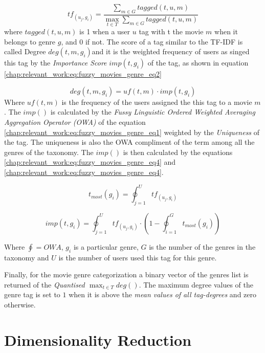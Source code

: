 \begin{equation}\label{chap:relevant_work:eq:fuzzy_movies_genre_eq1}
	tf_(u_{j},g_{i}) = \frac{\sum_{m \in G} tagged(t,u,m) }{ \max_{t \in T} \sum_{m \in G} tagged(t,u,m)}
\end{equation}
where $tagged(t,u,m)$ is 1 when a user $u$ tag with t the movie $m$ when it belongs to genre $g$, and $0$ if not. The score of a tag similar to the TF-IDF is called Degree $deg(t,m,g_{i})$and it is the weighted frequency of users as singed this tag by the \textit{Importance Score} $imp(t,g_{i})$ of the tag, as shown in equation \ref{chap:relevant_work:eq:fuzzy_movies_genre_eq2}

\begin{equation}\label{chap:relevant_work:eq:fuzzy_movies_genre_eq2}
	deg(t,m,g_{i}) = uf(t,m) \cdot imp(t,g_{i})
\end{equation}
Where $uf(t,m)$ is the frequency of the users assigned the this tag to a movie $m$. The $imp()$ is calculated by the \textit{Fussy Linguistic Ordered Weighted Averaging Aggregation Operator (OWA)} of the equation \ref{chap:relevant_work:eq:fuzzy_movies_genre_eq1} weighted by the \textit{Uniqueness} of the tag. The uniqueness is also the OWA compliment of the term among all the genres of the taxonomy. The $imp()$ is then calculated by the equations \ref{chap:relevant_work:eq:fuzzy_movies_genre_eq4} and \ref{chap:relevant_work:eq:fuzzy_movies_genre_eq4}.

\begin{equation}\label{chap:relevant_work:eq:fuzzy_movies_genre_eq3}
	t_{most}(g_{i}) = \oint_{j=1}^{U} tf_(u_{j},g_{i})
\end{equation}

\begin{equation}\label{chap:relevant_work:eq:fuzzy_movies_genre_eq4}
	imp(t,g_{i}) = \oint_{j=1}^{U} tf_(u_{j},g_{i}) \cdot (1 -  \oint_{i=1}^{G} t_{most}(g_{i}))
\end{equation}

Where $\oint=OWA$,  $g_{i}$ is a particular genre, $G$ is the number of the genres in the taxonomy and $U$ is the number of users used this tag for this genre.

Finally, for the movie genre categorization a binary vector of the genres list is returned of the \textit{Quantised  $\max_{t \in T} deg()$}. The maximum degree values of the genre tag is set to $1$ when it is above the \textit{mean values of all tag-degrees} and zero otherwise.

\section{Dimensionality Reduction}

